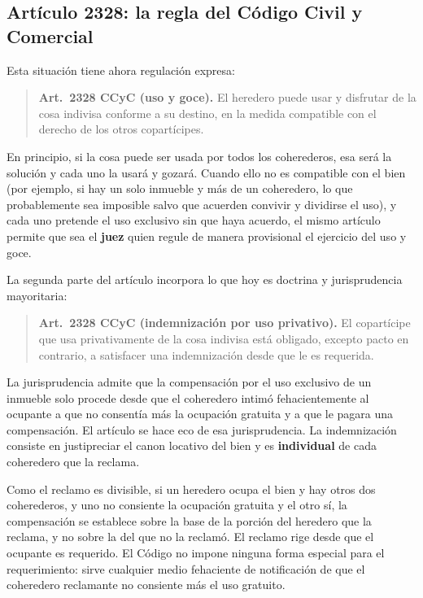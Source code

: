\documentclass[12pt,oneside]{book}
\begin{document}
\subsection{Artículo 2328: la regla del Código Civil y Comercial}

Esta situación tiene ahora regulación expresa:

\begin{quote}
\textbf{Art.~2328 CCyC (uso y goce).} El heredero puede usar y disfrutar de la cosa indivisa conforme a su destino, en la medida compatible con el derecho de los otros copartícipes.
\end{quote}

En principio, si la cosa puede ser usada por todos los coherederos, esa será la solución y cada uno la usará y gozará. Cuando ello no es compatible con el bien (por ejemplo, si hay un solo inmueble y más de un coheredero, lo que probablemente sea imposible salvo que acuerden convivir y dividirse el uso), y cada uno pretende el uso exclusivo sin que haya acuerdo, el mismo artículo permite que sea el \textbf{juez} quien regule de manera provisional el ejercicio del uso y goce.

La segunda parte del artículo incorpora lo que hoy es doctrina y jurisprudencia mayoritaria:

\begin{quote}
\textbf{Art.~2328 CCyC (indemnización por uso privativo).} El copartícipe que usa privativamente de la cosa indivisa está obligado, excepto pacto en contrario, a satisfacer una indemnización desde que le es requerida.
\end{quote}

La jurisprudencia admite que la compensación por el uso exclusivo de un inmueble solo procede desde que el coheredero intimó fehacientemente al ocupante a que no consentía más la ocupación gratuita y a que le pagara una compensación. El artículo se hace eco de esa jurisprudencia. La indemnización consiste en justipreciar el canon locativo del bien y es \textbf{individual} de cada coheredero que la reclama.

\begin{important}
Como el reclamo es divisible, si un heredero ocupa el bien y hay otros dos coherederos, y uno no consiente la ocupación gratuita y el otro sí, la compensación se establece sobre la base de la porción del heredero que la reclama, y no sobre la del que no la reclamó. El reclamo rige desde que el ocupante es requerido. El Código no impone ninguna forma especial para el requerimiento: sirve cualquier medio fehaciente de notificación de que el coheredero reclamante no consiente más el uso gratuito.
\end{important}
\end{document}
